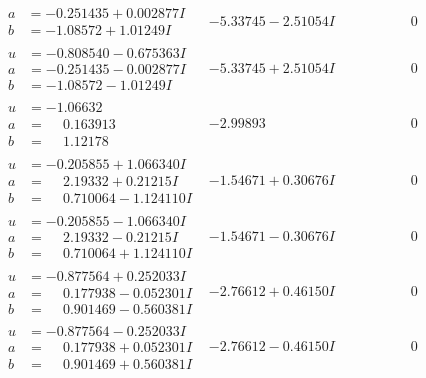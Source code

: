 \documentclass[1p]{elsarticle_modified}
\theoremstyle{definition}
\begin{document}
$$\begin{array}{c|c|c}
\begin{aligned}
a &= -0.251435 + 0.002877 I \\
b &= -1.08572 + 1.01249 I\end{aligned}
 & -5.33745 - 2.51054 I & \phantom{-0.000000 } 0 \\ \hline\begin{aligned}
u &= -0.808540 - 0.675363 I \\
a &= -0.251435 - 0.002877 I \\
b &= -1.08572 - 1.01249 I\end{aligned}
 & -5.33745 + 2.51054 I & \phantom{-0.000000 } 0 \\ \hline\begin{aligned}
u &= -1.06632\phantom{ +0.000000I} \\
a &= \phantom{-}0.163913\phantom{ +0.000000I} \\
b &= \phantom{-}1.12178\phantom{ +0.000000I}\end{aligned}
 & -2.99893\phantom{ +0.000000I} & \phantom{-0.000000 } 0 \\ \hline\begin{aligned}
u &= -0.205855 + 1.066340 I \\
a &= \phantom{-}2.19332 + 0.21215 I \\
b &= \phantom{-}0.710064 - 1.124110 I\end{aligned}
 & -1.54671 + 0.30676 I & \phantom{-0.000000 } 0 \\ \hline\begin{aligned}
u &= -0.205855 - 1.066340 I \\
a &= \phantom{-}2.19332 - 0.21215 I \\
b &= \phantom{-}0.710064 + 1.124110 I\end{aligned}
 & -1.54671 - 0.30676 I & \phantom{-0.000000 } 0 \\ \hline\begin{aligned}
u &= -0.877564 + 0.252033 I \\
a &= \phantom{-}0.177938 - 0.052301 I \\
b &= \phantom{-}0.901469 - 0.560381 I\end{aligned}
 & -2.76612 + 0.46150 I & \phantom{-0.000000 } 0 \\ \hline\begin{aligned}
u &= -0.877564 - 0.252033 I \\
a &= \phantom{-}0.177938 + 0.052301 I \\
b &= \phantom{-}0.901469 + 0.560381 I\end{aligned}
 & -2.76612 - 0.46150 I & \phantom{-0.000000 } 0 \\ \hline\begin{aligned}

\end{aligned}
\end{array}$$
\end{document}
